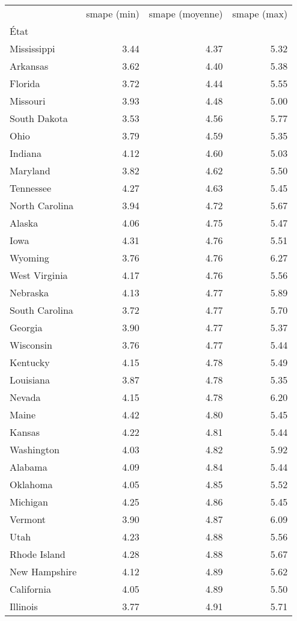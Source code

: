 \begin{tabular}{lrrr}
\toprule
 & smape (min) & smape (moyenne) & smape (max) \\
État &  &  &  \\
\midrule
Mississippi & 3.44 & 4.37 & 5.32 \\
Arkansas & 3.62 & 4.40 & 5.38 \\
Florida & 3.72 & 4.44 & 5.55 \\
Missouri & 3.93 & 4.48 & 5.00 \\
South Dakota & 3.53 & 4.56 & 5.77 \\
Ohio & 3.79 & 4.59 & 5.35 \\
Indiana & 4.12 & 4.60 & 5.03 \\
Maryland & 3.82 & 4.62 & 5.50 \\
Tennessee & 4.27 & 4.63 & 5.45 \\
North Carolina & 3.94 & 4.72 & 5.67 \\
Alaska & 4.06 & 4.75 & 5.47 \\
Iowa & 4.31 & 4.76 & 5.51 \\
Wyoming & 3.76 & 4.76 & 6.27 \\
West Virginia & 4.17 & 4.76 & 5.56 \\
Nebraska & 4.13 & 4.77 & 5.89 \\
South Carolina & 3.72 & 4.77 & 5.70 \\
Georgia & 3.90 & 4.77 & 5.37 \\
Wisconsin & 3.76 & 4.77 & 5.44 \\
Kentucky & 4.15 & 4.78 & 5.49 \\
Louisiana & 3.87 & 4.78 & 5.35 \\
Nevada & 4.15 & 4.78 & 6.20 \\
Maine & 4.42 & 4.80 & 5.45 \\
Kansas & 4.22 & 4.81 & 5.44 \\
Washington & 4.03 & 4.82 & 5.92 \\
Alabama & 4.09 & 4.84 & 5.44 \\
Oklahoma & 4.05 & 4.85 & 5.52 \\
Michigan & 4.25 & 4.86 & 5.45 \\
Vermont & 3.90 & 4.87 & 6.09 \\
Utah & 4.23 & 4.88 & 5.56 \\
Rhode Island & 4.28 & 4.88 & 5.67 \\
New Hampshire & 4.12 & 4.89 & 5.62 \\
California & 4.05 & 4.89 & 5.50 \\
Illinois & 3.77 & 4.91 & 5.71 \\

\end{tabular}
